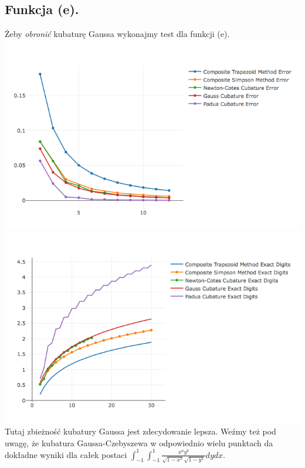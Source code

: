 \documentclass[10pt,wide]{mwart}
\theoremstyle{definition}
\begin{document}
\subsection{Funkcja (e).}
Żeby \emph{obronić} kubaturę Gaussa wykonajmy test dla funkcji (e). \\
\includegraphics[scale=0.7]{sqrt.png}
\includegraphics[scale=0.7]{sqrtd.png}
Tutaj zbieżność kubatury Gaussa jest zdecydowanie lepsza.
Weźmy też pod uwagę, że kubatura Gaussa-Czebyszewa w odpowiednio wielu punktach da dokładne wyniki dla całek postaci \( \int_{-1}^{1} \int_{-1}^{1} \frac{x^ay^b}{\sqrt{1-x^2}\sqrt{1-y^2}} dydx \).
\end{document}

